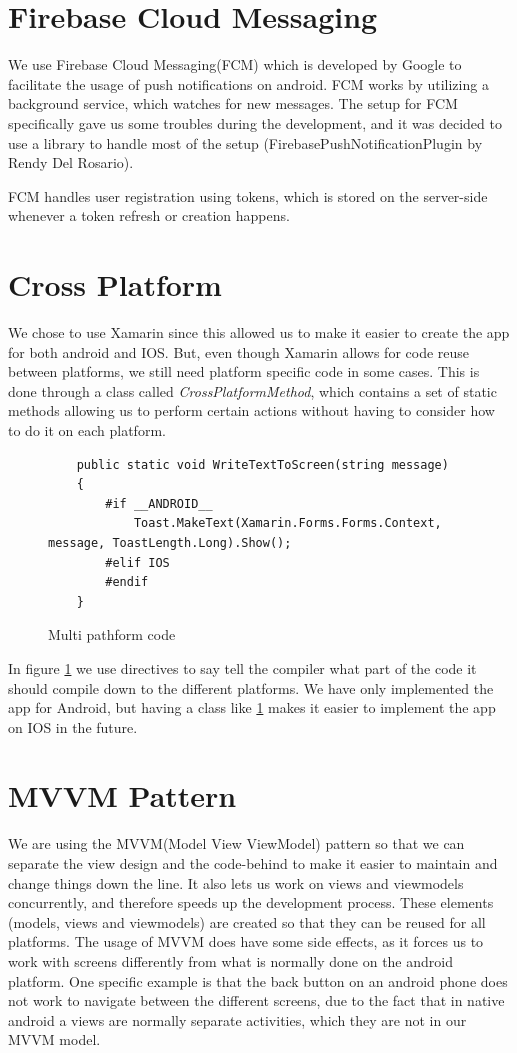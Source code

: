 \section{Firebase Cloud Messaging}
We use Firebase Cloud Messaging(FCM) which is developed by Google to facilitate the usage of push notifications on android. FCM works by utilizing a background service, which watches for new messages. The setup for FCM specifically gave us some troubles during the development, and it was decided to use a library to handle most of the setup (FirebasePushNotificationPlugin by Rendy Del Rosario).

FCM handles user registration using tokens, which is stored on the server-side whenever a token refresh or creation happens.

\section{Cross Platform}
We chose to use Xamarin since this allowed us to make it easier to create the app for both android and IOS. But, even though Xamarin allows for code reuse between platforms, we still need platform specific code in some cases. This is done through a class called \textit{CrossPlatformMethod}, which contains a set of static methods allowing us to perform certain actions without having to consider how to do it on each platform.

\begin{figure}[h]
    \centering
    \begin{lstlisting}
    public static void WriteTextToScreen(string message)
    {
        #if __ANDROID__
            Toast.MakeText(Xamarin.Forms.Forms.Context, message, ToastLength.Long).Show();
        #elif IOS
        #endif
    }
    \end{lstlisting}
    \caption{Multi pathform code}
    \label{fig:appMultiPlatform}
\end{figure}
In figure \ref{fig:appMultiPlatform} we use directives to say tell the compiler what part of the code it should compile down to the different platforms. We have only implemented the app for Android, but having a class like \ref{fig:appMultiPlatform} makes it easier to implement the app on IOS in the future.

\section{MVVM Pattern}
We are using the MVVM(Model View ViewModel) pattern so that we can separate the view design and the code-behind to make it easier to maintain and change things down the line. It also lets us work on views and viewmodels concurrently, and therefore speeds up the development process. These elements (models, views and viewmodels) are created so that they can be reused for all platforms. The usage of MVVM does have some side effects, as it forces us to work with screens differently from what is normally done on the android platform. One specific example is that the back button on an android phone does not work to navigate between the different screens, due to the fact that in native android a views are normally separate activities, which they are not in our MVVM model.



